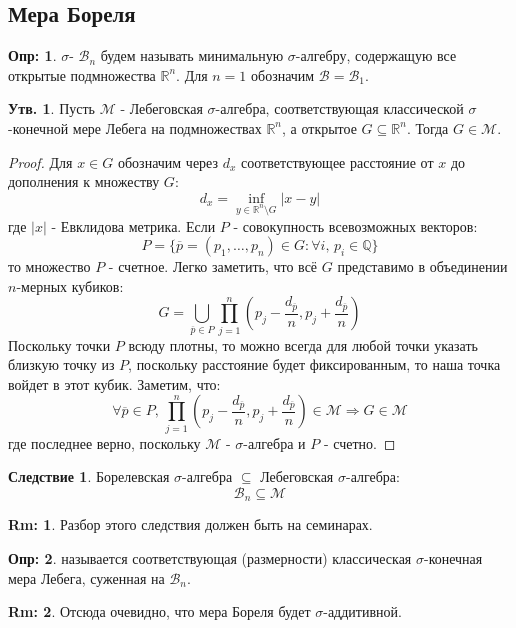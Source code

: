 \documentclass[12pt]{article}
\newcommand{\MR}{\mathbb{R}}
\newcommand{\MQ}{\mathbb{Q}}
\newcommand{\MB}{\mathcal{B}}
\newcommand{\MM}{\mathcal{M}}
\theoremstyle{definition}
\newtheorem{defn}{Опр:}
\newtheorem{rem}{Rm:}
\newtheorem{prop}{Утв.}
\newtheorem{corollary}{Следствие}
\begin{document}
\subsection*{Мера Бореля}
\begin{defn}
	 $\sigma$- $\MB_n$ будем называть минимальную $\sigma$-алгебру, содержащую все открытые подмножества $\MR^n$. Для $n = 1$ обозначим $\MB = \MB_1$.
\end{defn}
\begin{prop}
	Пусть $\MM$ - Лебеговская $\sigma$-алгебра, соответствующая классической $\sigma$-конечной мере Лебега на подмножествах $\MR^n$, а открытое $G \subseteq \MR^n$. Тогда $G \in \MM$.
\end{prop}
\begin{proof}
	Для $x \in G$ обозначим через $d_x$ соответствующее расстояние от $x$ до дополнения к множеству $G$:
	$$
		d_x = \inf\limits_{y \in \MR^n \setminus G}|x -y|
	$$
	где $|x|$ - Евклидова метрика. Если $P$ - совокупность всевозможных векторов:
	$$
		P = \{\overline{p} = (p_1,\dotsc, p_n) \in G \colon \forall i, \, p_i \in \MQ \}
	$$
	то множество $P$ - счетное. Легко заметить, что всё $G$ представимо в объединении $n$-мерных кубиков:
	$$
		G = \bigcup\limits_{\overline{p} \in P}\prod \limits_{j = 1}^n \left(p_j - \dfrac{d_{\overline{p}}}{n}, p_j + \dfrac{d_{\overline{p}}}{n} \right)
	$$
	Поскольку точки $P$ всюду плотны, то можно всегда для любой точки указать близкую точку из $P$, поскольку расстояние будет фиксированным, то наша точка войдет в этот кубик. Заметим, что:
	$$
		\forall \overline{p} \in P, \, \prod \limits_{j = 1}^n \left(p_j - \dfrac{d_{\overline{p}}}{n}, p_j + \dfrac{d_{\overline{p}}}{n} \right) \in \MM \Rightarrow G \in \MM
	$$
	где последнее верно, поскольку $\MM$ - $\sigma$-алгебра и $P$ - счетно.
\end{proof}
\begin{corollary}
	Борелевская $\sigma$-алгебра $\subseteq$ Лебеговская $\sigma$-алгебра:
	$$
		\MB_n \subseteq \MM 
	$$
\end{corollary}
\begin{rem}
	Разбор этого следствия должен быть на семинарах.
\end{rem}
\begin{defn}
	 называется соответствующая (размерности) классическая $\sigma$-конечная мера Лебега, суженная на $\MB_n$.
\end{defn}
\begin{rem}
	Отсюда очевидно, что мера Бореля будет $\sigma$-аддитивной.
\end{rem}
\end{document}
